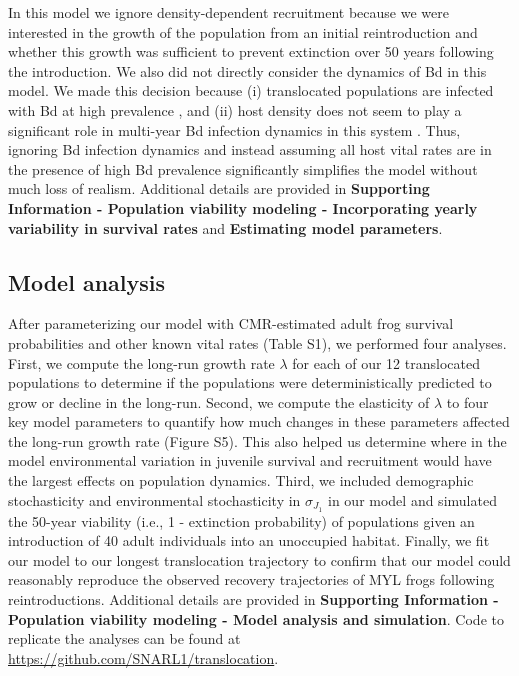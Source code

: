 \documentclass[9pt,twocolumn,twoside,lineno]{pnas-new}
\begin{document}
{In this model we ignore density-dependent recruitment because we were
interested in the growth of the population from an initial
reintroduction and whether this growth was sufficient to prevent
extinction over 50 years following the introduction. We also did not
directly consider the dynamics of Bd in this model. We made this
decision because (i) translocated populations are infected with Bd at
high prevalence \citep{joseph2018}, and (ii) host density does not seem
to play a significant role in multi-year Bd infection dynamics in this
system \citep{wilber2022}. Thus, ignoring Bd infection dynamics and
instead assuming all host vital rates are in the presence of high Bd
prevalence significantly simplifies the model without much loss of
realism. Additional details are provided in \textbf{Supporting
Information - Population viability modeling - Incorporating yearly
variability in survival rates} and \textbf{Estimating model parameters}.

\hypertarget{model-analysis}{%
\subsection*{Model analysis}\label{model-analysis}}

After parameterizing our model with CMR-estimated adult frog survival
probabilities and other known vital rates
(Table S1), we performed four analyses. First, we
compute the long-run growth rate \(\lambda\) for each of our 12
translocated populations to determine if the populations were
deterministically predicted to grow or decline in the long-run. Second,
we compute the elasticity of \(\lambda\) to four key model parameters to
quantify how much changes in these parameters affected the long-run
growth rate (Figure S5). This also helped us
determine where in the model environmental variation in juvenile
survival and recruitment would have the largest effects on population
dynamics. Third, we included demographic stochasticity and environmental
stochasticity in \(\sigma_{J_1}\) in our model and simulated the 50-year
viability (i.e., 1 - extinction probability) of populations given an
introduction of 40 adult individuals into an unoccupied habitat.
Finally, we fit our model to our longest translocation trajectory to
confirm that our model could reasonably reproduce the observed recovery
trajectories of MYL frogs following reintroductions. Additional details
are provided in \textbf{Supporting Information - Population viability
modeling - Model analysis and simulation}. Code to replicate the
analyses can be found at \url{https://github.com/SNARL1/translocation}.

}
\end{document}
